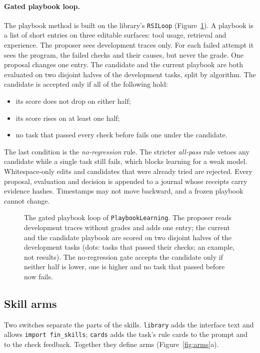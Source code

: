 \paragraph{Gated playbook loop.}
The playbook method is built on the library's \texttt{RSILoop} (Figure~\ref{fig:gate}). A playbook is a list of short
entries on three editable surfaces: tool usage, retrieval and experience. The proposer sees
development traces only. For each failed attempt it sees the program, the failed checks and
their causes, but never the grade. One proposal changes one entry. The candidate and the
current playbook are both evaluated on two disjoint halves of the development tasks, split by
algorithm. The candidate is accepted only if all of the following hold:
\begin{itemize}
\item its score does not drop on either half;
\item its score rises on at least one half;
\item no task that passed every check before fails one under the candidate.
\end{itemize}
The last condition is the \emph{no-regression} rule. The stricter \emph{all-pass} rule vetoes
any candidate while a single task still fails, which blocks learning for a weak model.
Whitespace-only edits and candidates that were already tried are rejected. Every proposal,
evaluation and decision is appended to a journal whose receipts carry evidence hashes.
Timestamps may not move backward, and a frozen playbook cannot change.

\begin{figure}[t]
\centering

\caption{The gated playbook loop of \texttt{PlaybookLearning}. The proposer reads development
traces without grades and adds one entry; the current and the candidate playbook are scored on
two disjoint halves of the development tasks (dots: tasks that passed their checks; an example,
not results). The no-regression gate accepts the candidate only if neither half is lower, one is
higher and no task that passed before now fails.}
\label{fig:gate}
\end{figure}

\subsection{Skill arms}
\label{sec:arms}

Two switches separate the parts of the skills. \texttt{library} adds the interface text and
allows \texttt{import fin\_skills}; \texttt{cards} adds the task's rule cards to the prompt
and to the check feedback. Together they define \NArms{} arms (Figure~\ref{fig:arms}a).

